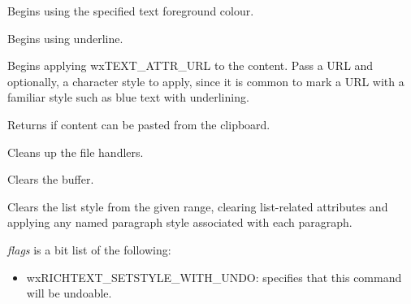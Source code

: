 
Begins using the specified text foreground colour.

\label{wxrichtextbufferbeginunderline}


Begins using underline.

\label{wxrichtextbufferbeginurl}


Begins applying wxTEXT\_ATTR\_URL to the content. Pass a URL and optionally, a character style to apply,
since it is common to mark a URL with a familiar style such as blue text with underlining.

\label{wxrichtextbuffercanpastefromclipboard}


Returns \true if content can be pasted from the clipboard.

\label{wxrichtextbuffercleanuphandlers}


Cleans up the file handlers.

\label{wxrichtextbufferclear}


Clears the buffer.

\label{wxrichtextbufferclearliststyle}



Clears the list style from the given range, clearing list-related attributes and applying any named paragraph style associated with each paragraph.

{\it flags} is a bit list of the following:

\begin{itemize}\itemsep=0pt
\item wxRICHTEXT\_SETSTYLE\_WITH\_UNDO: specifies that this command will be undoable.
\end{itemize}

